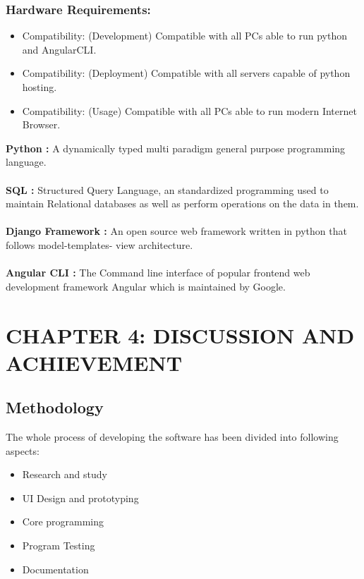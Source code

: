 \documentclass[12pt]{article}
\begin{document}
\subsubsection{Hardware Requirements:}
\begin{itemize}
    \item Compatibility: (Development) Compatible with all PCs able to run python and AngularCLI.
    \item Compatibility: (Deployment) Compatible with all servers capable of python hosting.
    \item Compatibility: (Usage) Compatible with all PCs able to run modern Internet Browser.
\end{itemize}

\vspace*{10mm}
\textbf{Python :} A dynamically typed multi paradigm general purpose programming language.
\\\\
\textbf{SQL :} Structured Query Language, an standardized programming used to maintain Relational
databases as well as perform operations on the data in them.
\\\\
\textbf{Django Framework :} An open source web framework written in python that follows model-templates-
view architecture.
\\\\
\textbf{Angular CLI :} The Command line interface of popular frontend web development framework Angular
which is maintained by Google.

\clearpage
\section{CHAPTER 4: DISCUSSION AND  ACHIEVEMENT}

\subsection{Methodology}
The whole process of developing the software has been divided into following aspects:
\begin{itemize}
    \item Research and study
    \item UI Design and prototyping
    \item Core programming
    \item Program Testing
    \item Documentation
\end{itemize}
\end{document}
